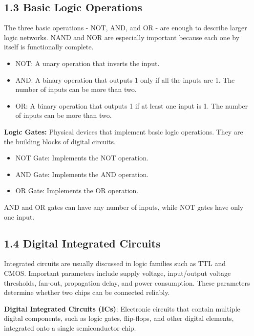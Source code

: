 \documentclass[11pt,a4paper]{article}
\providecommand{\tightlist}{\setlength{\itemsep}{1pt}\setlength{\parskip}{0pt}}
\begin{document}
\subsection{1.3 Basic Logic Operations}\label{basic-logic-operations}

The three basic operations - NOT, AND, and OR - are enough to describe
larger logic networks. NAND and NOR are especially important because
each one by itself is functionally complete.

\begin{itemize}
\tightlist
\item
  NOT: A unary operation that inverts the input.
\item
  AND: A binary operation that outputs 1 only if all the inputs are 1.
  The number of inputs can be more than two.
\item
  OR: A binary operation that outputs 1 if at least one input is 1. The
  number of inputs can be more than two.
\end{itemize}

\textbf{Logic Gates:} Physical devices that implement basic logic
operations. They are the building blocks of digital circuits.

\begin{itemize}
\tightlist
\item
  NOT Gate: Implements the NOT operation.
\item
  AND Gate: Implements the AND operation.
\item
  OR Gate: Implements the OR operation.
\end{itemize}

AND and OR gates can have any number of inputs, while NOT gates have
only one input.

\subsection{1.4 Digital Integrated
Circuits}\label{digital-integrated-circuits}

Integrated circuits are usually discussed in logic families such as TTL
and CMOS. Important parameters include supply voltage, input/output
voltage thresholds, fan-out, propagation delay, and power consumption.
These parameters determine whether two chips can be connected reliably.

\textbf{Digital Integrated Circuits (ICs)}: Electronic circuits that
contain multiple digital components, such as logic gates, flip-flops,
and other digital elements, integrated onto a single semiconductor chip.
\end{document}
